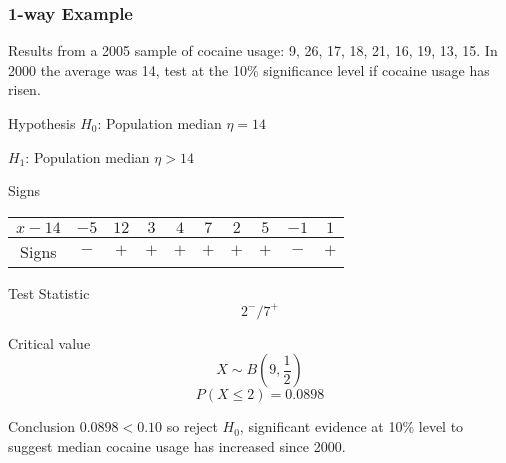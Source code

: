         \subsubsection{1-way Example}
            \begin{example}
            {
            Results from a 2005 sample of cocaine usage: 9, 26, 17, 18, 21, 16, 19, 13, 15. In 2000 the average was 14, test at the 10\% significance level if cocaine usage has risen.
            }
        
            \begin{step}{Hypothesis}
            $H_0$: Population median $\eta = 14$
            
            $H_1$: Population median $\eta > 14$
            \end{step}
            
            \begin{step}{Signs}
            \begin{center}
            \begin{tabular}{c|c|c|c|c|c|c|c|c|c}
                $x - 14$ & $-5$ & $12$ & $3$  & $4$  & $7$  & $2$  & $5$  & $-1$ & $1$ \\
                \hline
                Signs    & $-$  & $+$  & $+$  & $+$  & $+$  & $+$  & $+$  & $-$  & $+$  
            \end{tabular}
            \end{center}
            \end{step}
            
            \begin{step}{Test Statistic}
            $$2^- / 7^+$$
            \end{step}
            
            \begin{step}{Critical value}
            $$X \sim B(9, \frac{1}{2})$$
            $$P(X \leq 2) = 0.0898$$
            \end{step}
            
            \begin{step}{Conclusion}
            $0.0898 < 0.10$ so reject $H_0$, significant evidence at 10\% level to suggest median cocaine usage has increased since 2000.
            \end{step}
            
            \end{example}
        
